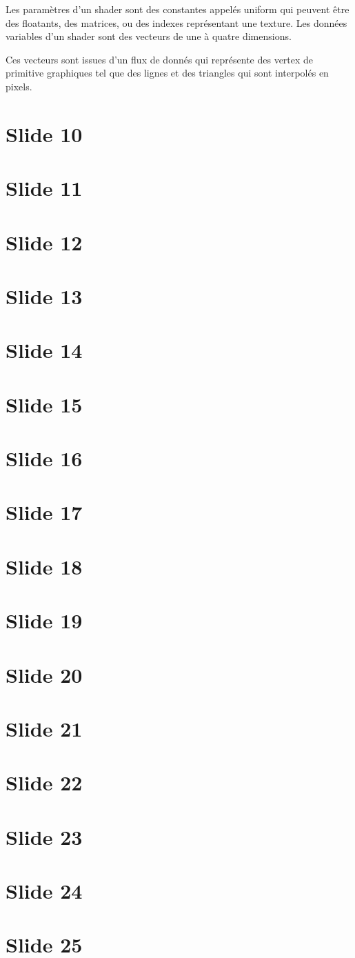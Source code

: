 \documentclass[12pt]{article}
\begin{document}
Les paramètres d'un shader sont des constantes appelés uniform qui peuvent être des floatants, des
matrices, ou des indexes représentant une texture. Les données variables d'un shader sont des
vecteurs de une à quatre dimensions.

Ces vecteurs sont issues d'un flux de donnés qui représente des vertex de primitive graphiques tel
que des lignes et des triangles qui sont interpolés en pixels.  

\section{Slide 10}
\section{Slide 11}
\section{Slide 12}
\section{Slide 13}
\section{Slide 14}
\section{Slide 15}
\section{Slide 16}
\section{Slide 17}
\section{Slide 18}
\section{Slide 19}
\section{Slide 20}
\section{Slide 21}
\section{Slide 22}
\section{Slide 23}
\section{Slide 24}
\section{Slide 25}
\end{document}
